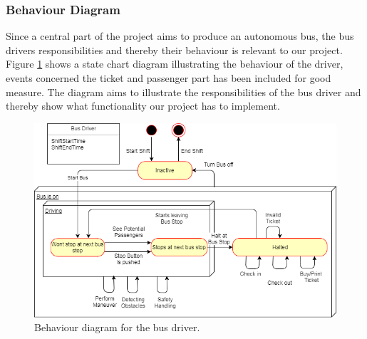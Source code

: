 \subsubsection{Behaviour Diagram}
Since a central part of the project aims to produce an autonomous bus, the bus drivers responsibilities and thereby their behaviour is relevant to our project. Figure \ref{BehaviorDiagramBusDriver} shows a state chart diagram illustrating the behaviour of the driver, events concerned the ticket and passenger part has been included for good measure. The diagram aims to illustrate the responsibilities of the bus driver and thereby show what functionality our project has to implement.

\begin{figure}[H]
\centering
\includegraphics[scale=0.6]{Images/BehaviorDiagramBusDriver.png}
\caption{Behaviour diagram for the bus driver.}
\label{BehaviorDiagramBusDriver}
\end{figure}

